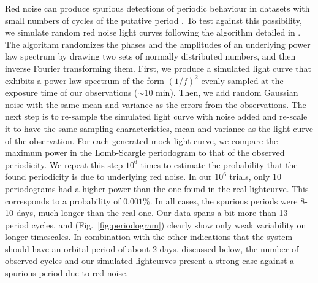 \documentclass[fleqn,usenatbib,useAMS,letters]{mnras}
\begin{document}
Red noise %
can produce spurious detections of periodic behaviour in datasets with small numbers of cycles of the putative period \citep{Press1978RedNoise}.%
To test against this possibility, we simulate random red noise light curves following the algorithm detailed in \citet{Timmer1995Rednoise}. The algorithm randomizes the phases and the amplitudes of an underlying power law spectrum by drawing two sets of normally distributed numbers, and then inverse Fourier transforming them. First, we produce a simulated light curve that exhibits a power law spectrum of the form $(1/f)^2$ evenly sampled at the exposure time of our observations ($\sim 10$ min). Then, we add random Gaussian noise with the same mean and variance as the errors from the observations. The next step is to re-sample the  simulated light curve with noise added and  re-scale it to have the same sampling characteristics, mean and variance as the light curve of the observation. For each generated mock light curve, we compare the maximum power in the Lomb-Scargle periodogram to that of the observed periodicity. We repeat this step $10^6$ times to estimate the probability that the found periodicity is due to underlying red noise. In our $10^6$ trials, only 10 periodograms had a higher power than the one found in the real lightcurve. This corresponds to a probability of $0.001\%$.  In all cases, the spurious periods were 8-10 days, much longer than the real one. 
Our data spans a bit more than 13 period cycles, and  (Fig.~\ref{fig:periodogram}) clearly show only weak variability on longer timescales.  In combination with the other indications that the system should have an orbital period of about 2 days, discussed below, the number of observed cycles and our simulated lightcurves present a strong case against a spurious period due to red noise.


\end{document}
